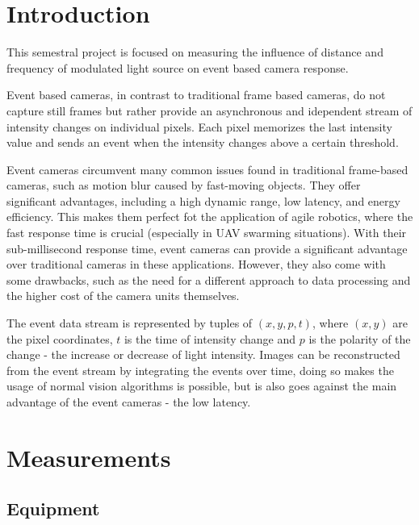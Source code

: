 
\chapter{Introduction\label{chap:introduction}}

This semestral project is focused on measuring the influence of distance and frequency of modulated
light source on event based camera response.

Event based cameras, in contrast to traditional frame based cameras, do not capture still frames but rather
provide an asynchronous and idependent stream of intensity changes on individual pixels.
Each pixel memorizes the last intensity value and sends an event when the intensity changes above a certain threshold.  \cite{gallego2020event}

Event cameras circumvent many common issues found in traditional frame-based cameras, such as motion blur caused
by fast-moving objects. They offer significant advantages, including a high dynamic range, low latency,
and energy efficiency.
This makes them perfect fot the application of agile robotics,
where the fast response time is crucial (especially in \ac{UAV} swarming situations). With their sub-millisecond response time,
event cameras can provide a significant advantage over traditional cameras in these applications.
However, they also come with some drawbacks, such as the need for a different approach to
data processing and the higher cost of the camera units themselves. \cite{gallego2020event}

The event data stream is represented by tuples of $(x, y, p, t)$, where $(x, y)$ are the pixel coordinates, $t$ is the time of
intensity change and $p$ is the polarity of the change - the increase or decrease of light intensity. Images can be
reconstructed from the event stream by integrating the events over time, doing so makes the usage of normal vision 
algorithms is possible, but is also goes against the main advantage of the event cameras - the low latency.

\chapter{Measurements\label{chap:measurements}}

\section{Equipment}

